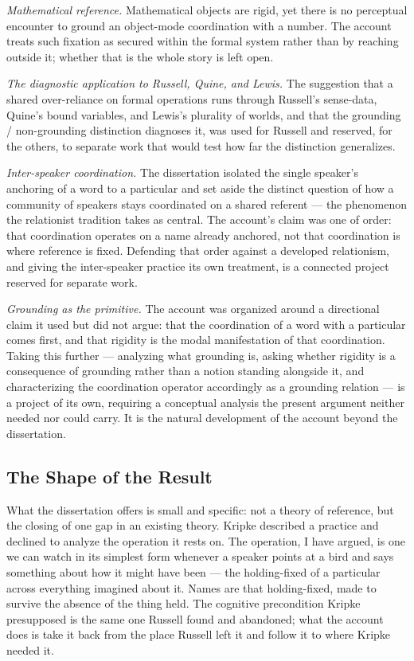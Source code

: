 \documentclass[12pt,a4paper]{article}
\begin{document}
\emph{Mathematical reference.} Mathematical objects are rigid, yet there is no perceptual encounter to ground an object-mode coordination with a number. The account treats such fixation as secured within the formal system rather than by reaching outside it; whether that is the whole story is left open.

\emph{The diagnostic application to Russell, Quine, and Lewis.} The suggestion that a shared over-reliance on formal operations runs through Russell's sense-data, Quine's bound variables, and Lewis's plurality of worlds, and that the grounding / non-grounding distinction diagnoses it, was used for Russell and reserved, for the others, to separate work that would test how far the distinction generalizes.

\emph{Inter-speaker coordination.} The dissertation isolated the single speaker's anchoring of a word to a particular and set aside the distinct question of how a community of speakers stays coordinated on a shared referent --- the phenomenon the relationist tradition takes as central. The account's claim was one of order: that coordination operates on a name already anchored, not that coordination is where reference is fixed. Defending that order against a developed relationism, and giving the inter-speaker practice its own treatment, is a connected project reserved for separate work.

\emph{Grounding as the primitive.} The account was organized around a directional claim it used but did not argue: that the coordination of a word with a particular comes first, and that rigidity is the modal manifestation of that coordination. Taking this further --- analyzing what grounding is, asking whether rigidity is a consequence of grounding rather than a notion standing alongside it, and characterizing the coordination operator accordingly as a grounding relation --- is a project of its own, requiring a conceptual analysis the present argument neither needed nor could carry. It is the natural development of the account beyond the dissertation.

\subsection{The Shape of the Result}\label{the-shape-of-the-result}

What the dissertation offers is small and specific: not a theory of reference, but the closing of one gap in an existing theory. Kripke described a practice and declined to analyze the operation it rests on. The operation, I have argued, is one we can watch in its simplest form whenever a speaker points at a bird and says something about how it might have been --- the holding-fixed of a particular across everything imagined about it. Names are that holding-fixed, made to survive the absence of the thing held. The cognitive precondition Kripke presupposed is the same one Russell found and abandoned; what the account does is take it back from the place Russell left it and follow it to where Kripke needed it.
\end{document}
